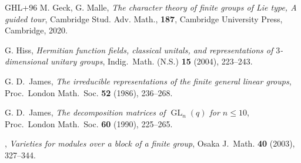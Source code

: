 \documentclass[12pt,a4paper]{amsart}
\theoremstyle{plain}\newtheorem{Theorem}{Theorem}[section]
\theoremstyle{plain}\newtheorem{Conjecture}[Theorem]{Conjecture}
\theoremstyle{plain}\newtheorem{Corollary}[Theorem]{Corollary}
\theoremstyle{plain}\newtheorem{Lemma}[Theorem]{Lemma}
\theoremstyle{plain}\newtheorem{Proposition}[Theorem]{Proposition}
\theoremstyle{definition}\newtheorem{Definition}[Theorem]{Definition}
\theoremstyle{definition}\newtheorem{Example}[Theorem]{Example}
\theoremstyle{definition}\newtheorem{Examples}[Theorem]{Examples}
\theoremstyle{definition}\newtheorem{Remark}[Theorem]{Remark}
\theoremstyle{definition}\newtheorem{Question}[Theorem]{Question}
\theoremstyle{definition}\newtheorem{Notation}[Theorem]{Notation}
\theoremstyle{definition}\newtheorem{Hypothesis}[Theorem]{Hypothesis}
\theoremstyle{definition}\newtheorem{Assumption}[Theorem]{Assumption}
\theoremstyle{definition}\newtheorem{Strategy}[Theorem]{Strategy}
\theoremstyle{definition}\newtheorem{Contents}[Theorem]{Contents}
\theoremstyle{definition}\newtheorem{Computations}[Theorem]{Computations}
\theoremstyle{definition}\newtheorem{Equivalences}[Theorem]{Equivalences}
\theoremstyle{definition}\newtheorem{Notation/Definition}[Theorem]{Notation/Definition}
\theoremstyle{definition}\newtheorem{noth}[Theorem]{}
\theoremstyle{plain}\newtheorem{Step}[Theorem]{Step}
\newcommand{\GL}{\operatorname{GL}}
\begin{document}
\begin{thebibliography}{GHL+96}
{\sc M. Geck, G. Malle},
\emph{The character theory of finite groups of Lie type, A guided tour},
Cambridge Stud. Adv. Math., \textbf{187}, 
Cambridge University Press, Cambridge, 2020.










 {\sc G. Hiss}, 
\emph{Hermitian function fields, classical unitals, and representations of 
$3$-dimensional unitary groups}, Indig.~Math. (N.S.)
\textbf{15} (2004), 223--243. 




 {\sc G. D.~James}, 
\emph{The irreducible representations of the finite general linear groups}, 
Proc.~London Math.~Soc. \textbf{52} (1986), 236--268.


 {\sc G. D.~James},
\emph{The decomposition matrices of $\GL_n(q)$ for $n \leq 10$}, 
Proc.~London Math.~Soc. \textbf{60} (1990), 225--265.


,
\emph{Varieties for modules over a block of a finite group},
Osaka J.~Math. \textbf{40} (2003), 327--344.





\end{thebibliography}
\end{document}
